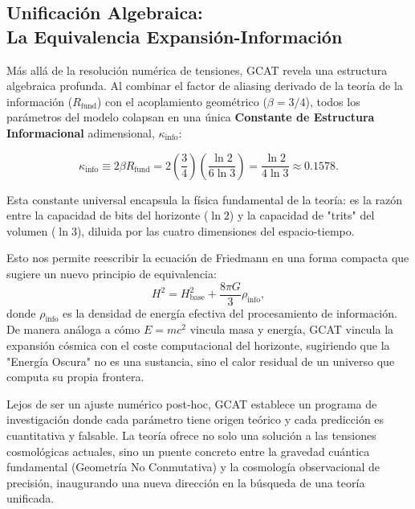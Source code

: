 \documentclass[12pt, a4paper]{article}
\theoremstyle{plain}
\theoremstyle{definition}
\begin{document}
\subsection[Unificación Algebraica: La Equivalencia Expansión-Información]{Unificación Algebraica: \\ La Equivalencia Expansión-Información}

Más allá de la resolución numérica de tensiones, GCAT revela una estructura algebraica profunda. Al combinar el factor de aliasing derivado de la teoría de la información ($R_{\text{fund}}$) con el acoplamiento geométrico ($\beta=3/4$), todos los parámetros del modelo colapsan en una única \textbf{Constante de Estructura Informacional} adimensional, $\kappa_{\text{info}}$:

\begin{equation}
\kappa_{\text{info}} \equiv 2\beta R_{\text{fund}} = 2 \left(\frac{3}{4}\right) \left(\frac{\ln 2}{6\ln 3}\right) = \frac{\ln 2}{4\ln 3} \approx 0.1578.
\end{equation}

Esta constante universal encapsula la física fundamental de la teoría: es la razón entre la capacidad de bits del horizonte ($\ln 2$) y la capacidad de "trits" del volumen ($\ln 3$), diluida por las cuatro dimensiones del espacio-tiempo. 

Esto nos permite reescribir la ecuación de Friedmann en una forma compacta que sugiere un nuevo principio de equivalencia:
\begin{equation}
H^2 = H_{\text{base}}^2 + \frac{8\pi G}{3} \rho_{\text{info}},
\end{equation}
donde $\rho_{\text{info}}$ es la densidad de energía efectiva del procesamiento de información. De manera análoga a cómo $E=mc^2$ vincula masa y energía, GCAT vincula la expansión cósmica con el coste computacional del horizonte, sugiriendo que la "Energía Oscura" no es una sustancia, sino el calor residual de un universo que computa su propia frontera.

Lejos de ser un ajuste numérico post-hoc, GCAT establece un programa de investigación donde cada parámetro tiene origen teórico y cada predicción es cuantitativa y falsable. La teoría ofrece no solo una solución a las tensiones cosmológicas actuales, sino un puente concreto entre la gravedad cuántica fundamental (Geometría No Conmutativa) y la cosmología observacional de precisión, inaugurando una nueva dirección en la búsqueda de una teoría unificada.

\appendix
\end{document}
